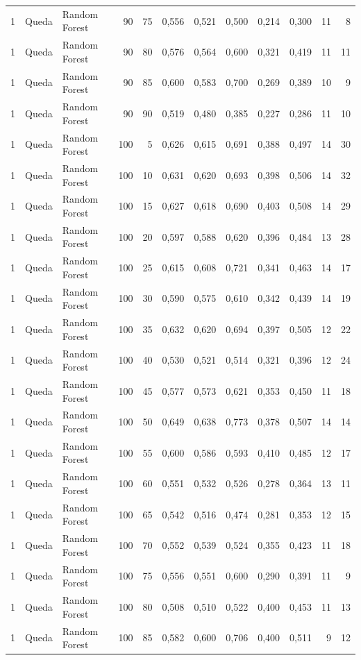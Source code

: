 \begin{longtable}{@{}rllrrrrrrrrr@{}}
1 & Queda & Random Forest & 90 & 75 & 0,556 & 0,521 & 0,500 & 0,214 & 0,300 & 11 & 8 \\
1 & Queda & Random Forest & 90 & 80 & 0,576 & 0,564 & 0,600 & 0,321 & 0,419 & 11 & 11 \\
1 & Queda & Random Forest & 90 & 85 & 0,600 & 0,583 & 0,700 & 0,269 & 0,389 & 10 & 9 \\
1 & Queda & Random Forest & 90 & 90 & 0,519 & 0,480 & 0,385 & 0,227 & 0,286 & 11 & 10 \\
1 & Queda & Random Forest & 100 & 5 & 0,626 & 0,615 & 0,691 & 0,388 & 0,497 & 14 & 30 \\
1 & Queda & Random Forest & 100 & 10 & 0,631 & 0,620 & 0,693 & 0,398 & 0,506 & 14 & 32 \\
1 & Queda & Random Forest & 100 & 15 & 0,627 & 0,618 & 0,690 & 0,403 & 0,508 & 14 & 29 \\
1 & Queda & Random Forest & 100 & 20 & 0,597 & 0,588 & 0,620 & 0,396 & 0,484 & 13 & 28 \\
1 & Queda & Random Forest & 100 & 25 & 0,615 & 0,608 & 0,721 & 0,341 & 0,463 & 14 & 17 \\
1 & Queda & Random Forest & 100 & 30 & 0,590 & 0,575 & 0,610 & 0,342 & 0,439 & 14 & 19 \\
1 & Queda & Random Forest & 100 & 35 & 0,632 & 0,620 & 0,694 & 0,397 & 0,505 & 12 & 22 \\
1 & Queda & Random Forest & 100 & 40 & 0,530 & 0,521 & 0,514 & 0,321 & 0,396 & 12 & 24 \\
1 & Queda & Random Forest & 100 & 45 & 0,577 & 0,573 & 0,621 & 0,353 & 0,450 & 11 & 18 \\
1 & Queda & Random Forest & 100 & 50 & 0,649 & 0,638 & 0,773 & 0,378 & 0,507 & 14 & 14 \\
1 & Queda & Random Forest & 100 & 55 & 0,600 & 0,586 & 0,593 & 0,410 & 0,485 & 12 & 17 \\
1 & Queda & Random Forest & 100 & 60 & 0,551 & 0,532 & 0,526 & 0,278 & 0,364 & 13 & 11 \\
1 & Queda & Random Forest & 100 & 65 & 0,542 & 0,516 & 0,474 & 0,281 & 0,353 & 12 & 15 \\
1 & Queda & Random Forest & 100 & 70 & 0,552 & 0,539 & 0,524 & 0,355 & 0,423 & 11 & 18 \\
1 & Queda & Random Forest & 100 & 75 & 0,556 & 0,551 & 0,600 & 0,290 & 0,391 & 11 & 9 \\
1 & Queda & Random Forest & 100 & 80 & 0,508 & 0,510 & 0,522 & 0,400 & 0,453 & 11 & 13 \\
1 & Queda & Random Forest & 100 & 85 & 0,582 & 0,600 & 0,706 & 0,400 & 0,511 & 9 & 12 \\

\end{longtable}
